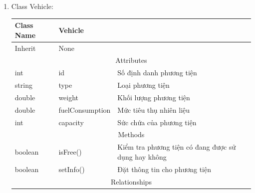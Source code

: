 \begin{enumerate}
            
        \item Class Vehicle:
        \begin{table}[htp]
            \begin{tabular}{|lll|}
                \hline
                \multicolumn{1}{|l|}{Class Name} & \multicolumn{2}{l|}{Vehicle}                                                               \\ \hline
                \multicolumn{1}{|l|}{Inherit}    & \multicolumn{2}{l|}{None}                                                                  \\ \hline
                \multicolumn{3}{|c|}{\cellcolor[HTML]{FFFFC7}Attributes}                                                                      \\ \hline
                \multicolumn{1}{|l|}{int}        & \multicolumn{1}{l|}{id}              & Số định danh phương tiện                            \\ \hline
                \multicolumn{1}{|l|}{string}     & \multicolumn{1}{l|}{type}            & Loại phương tiện                                    \\ \hline
                \multicolumn{1}{|l|}{double}     & \multicolumn{1}{l|}{weight}          & Khối lượng phương tiện                              \\ \hline
                \multicolumn{1}{|l|}{double}     & \multicolumn{1}{l|}{fuelConsumption} & Mức tiêu thụ nhiên liệu                             \\ \hline
                \multicolumn{1}{|l|}{int}        & \multicolumn{1}{l|}{capacity}        & Sức chứa của phương tiện                            \\ \hline
                \multicolumn{3}{|c|}{\cellcolor[HTML]{FFFFC7}Methods}                                                                         \\ \hline
                \multicolumn{1}{|l|}{boolean}    & \multicolumn{1}{l|}{isFree()}        & Kiểm tra phương tiện có đang được sử dụng hay không \\ \hline
                \multicolumn{1}{|l|}{boolean}    & \multicolumn{1}{l|}{setInfo()}       & Đặt thông tin cho phương tiện                       \\ \hline
                \multicolumn{3}{|c|}{\cellcolor[HTML]{FFFFC7}Relationships}                                                                   \\ \hline
            \end{tabular}
        \end{table}
            

\end{enumerate}
